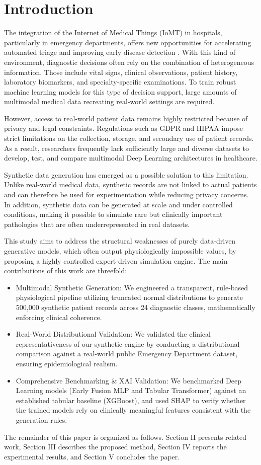 \section{Introduction}

The integration of the Internet of Medical Things (IoMT) in hospitals, particularly in emergency departments, offers new opportunities for accelerating automated triage and improving early disease detection \cite{esteva2019}. With this kind of environment, diagnostic decisions often rely on the combination of heterogeneous information. Those include vital signs, clinical observations, patient history, laboratory biomarkers, and specialty-specific examinations. To train robust machine learning models for this type of decision support, large amounts of multimodal medical data recreating real-world settings are required.

However, access to real-world patient data remains highly restricted because of privacy and legal constraints. Regulations such as GDPR and HIPAA impose strict limitations on the collection, storage, and secondary use of patient records. As a result, researchers frequently lack sufficiently large and diverse datasets to develop, test, and compare multimodal Deep Learning architectures in healthcare.

Synthetic data generation has emerged as a possible solution to this limitation. Unlike real-world medical data, synthetic records are not linked to actual patients and can therefore be used for experimentation while reducing privacy concerns. In addition, synthetic data can be generated at scale and under controlled conditions, making it possible to simulate rare but clinically important pathologies that are often underrepresented in real datasets.

This study aims to address the structural weaknesses of purely data-driven generative models, which often output physiologically impossible values, by proposing a highly controlled expert-driven simulation engine. The main contributions of this work are threefold:
\begin{itemize}
    \item Multimodal Synthetic Generation: We engineered a transparent, rule-based physiological pipeline utilizing truncated normal distributions to generate 500,000 synthetic patient records across 24 diagnostic classes, mathematically enforcing clinical coherence.
    \item Real-World Distributional Validation: We validated the clinical representativeness of our synthetic engine by conducting a distributional comparison against a real-world public Emergency Department dataset, ensuring epidemiological realism.
    \item Comprehensive Benchmarking \& XAI Validation: We benchmarked Deep Learning models (Early Fusion MLP and Tabular Transformer) against an established tabular baseline (XGBoost), and used SHAP to verify whether the trained models rely on clinically meaningful features consistent with the generation rules.
\end{itemize}

The remainder of this paper is organized as follows. Section II presents related work, Section III describes the proposed method, Section IV reports the experimental results, and Section V concludes the paper.